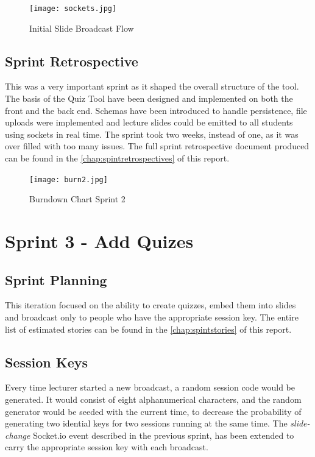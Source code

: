 \begin{figure}[h!]
    \centering
    \texttt{[image: sockets.jpg]}
    \caption{Initial Slide Broadcast Flow}
    \label{fig:sockets}
\end{figure}

\newpage
\subsection{Sprint Retrospective}
This was a very important sprint as it shaped the overall structure of the tool. The basis
of the Quiz Tool have been designed and implemented on both the front and the back end.
Schemas have been introduced to handle persistence, file uploads were implemented and
lecture slides could be emitted to all students using sockets in real time. The sprint
took two weeks, instead of one, as it was over filled with too many issues.
The full sprint retrospective document produced can be found in the \autoref{chap:spintretrospectives} of this report.

\begin{figure}[h!]
    \centering
    \texttt{[image: burn2.jpg]}
    \caption{Burndown Chart Sprint 2}
    \label{fig:burn1}
\end{figure}

\section{Sprint 3 - Add Quizes}
\subsection{Sprint Planning}
This iteration focused on the ability to create quizzes, embed them into slides and
broadcast only to people who have the appropriate session key. The entire list of estimated stories
can be found in the \autoref{chap:spintstories} of this report.

\subsection{Session Keys}
Every time lecturer started a new broadcast, a random session code would be generated.
It would consist of eight alphanumerical characters, and the random generator would
be seeded with the current time, to decrease the probability of generating two idential
keys for two sessions running at the same time. The \textit{slide-change} Socket.io event
described in the previous sprint, has been extended to carry the appropriate session key
with each broadcast.


